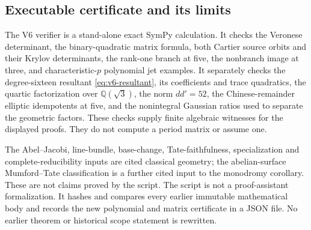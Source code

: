 \documentclass[11pt]{article}
\theoremstyle{definition}
\theoremstyle{remark}
\newcommand{\Q}{\mathbb Q}
\begin{document}
\subsection{Executable certificate and its limits}
The V6 verifier is a stand-alone exact SymPy calculation. It checks the
Veronese determinant, the binary-quadratic matrix formula, both Cartier
source orbits and their Krylov determinants, the rank-one branch at five,
the nonbranch image at three, and characteristic-$p$ polynomial jet
examples. It separately checks the degree-sixteen resultant
\eqref{eq:v6-resultant}, its coefficients and trace quadratics, the
quartic factorization over $\Q(\sqrt3)$, the norm $dd'=52$, the
Chinese-remainder elliptic idempotents at five, and the nonintegral
Gaussian ratios used to separate the geometric factors. These checks
supply finite algebraic witnesses for the displayed proofs. They do not
compute a period matrix or assume one.

The Abel--Jacobi, line-bundle, base-change, Tate-faithfulness,
specialization and complete-reducibility inputs are cited classical
geometry; the abelian-surface Mumford--Tate classification is a further
cited input to the monodromy corollary. These are not claims proved by the
script. The script is not a
proof-assistant formalization. It hashes and compares every earlier
immutable mathematical body and records the new polynomial and matrix
certificate in a JSON file. No earlier theorem or historical scope
statement is rewritten.
\end{document}
